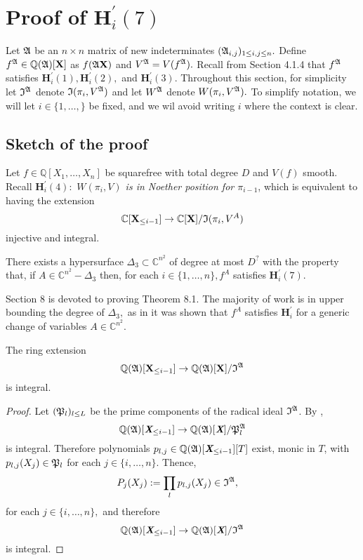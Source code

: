 \documentclass[sigconf]{acmart}
\def\Xb{\textit{\textbf{X}}}
\def\C{\mathbb{C}}
\def\I{\frak{I}}
\def\A{\frak{A}}
\def\fp{\frak{P}}
\begin{document}
\section{Proof of $\textbf{H}_i^{'}(7)$}
%
Let $\A$ be an $n \times n$ matrix of new indeterminates $(\A_{i,j})_{1 \leq i , j \leq n}.$ Define $f^{\A} \in \mathbb{Q}(\A)[\textbf{X}]$ as $f(\A\textbf{X})$ and $V^\A=V(f^\A).$ Recall from Section 4.1.4 that $f^\A$ satisfies $\textbf{H}_i^{'}(1),\textbf{H}_i^{'}(2),$ and $\textbf{H}_i^{'}(3).$ Throughout this section, for simplicity let $\I^\A$ denote $\I(\pi_i,V^\A)$ and let $W^\A$ denote $W(\pi_i,V^\A).$ To simplify notation, we will let $i \in \{1,\hdots,\}$ be fixed, and we wil avoid writing $i$ where the context is clear. 
%
\subsection{Sketch of the proof}
Let $f \in \mathbb{Q}[X_1,\hdots,X_n]$ be squarefree with total degree $D$ and $V(f)$ smooth. Recall $\textbf{H}_i^{'}(4):$ \textit{$W(\pi_i,V)$ is in Noether position for $\pi_{i-1}$}, which is equivalent to having the extension  
\[
\C[\textbf{X}_{\leq i-1}]\rightarrow\C[\textbf{X}]/\frak{I}(\pi_i,V^A)
\]
injective and  integral.
%
\begin{theorem}
There exists a hypersurface $\Delta_3 \subset \C^{n^2}$ of degree at most $D^{?}$ with the property that, if $A \in \C^{n^2} - \Delta_3$ then, for each $i \in\{1,\hdots,n\}, f^A$ satisfies $\textbf{H}_i^{'}(7)$.
\end{theorem}
%
Section 8 is devoted to proving Theorem 8.1. The majority of work is in upper bounding the degree of $\Delta_3,$ as in \cite{EMP} it was shown that $f^A$ satisfies $\textbf{H}_i^{'}$ for a generic change of variables $A\in\C^{n^2}.$ 
%
\begin{proposition} 
The ring extension \[\mathbb{Q}(\frak{A})[\textbf{X}_{\leq i-1}]\rightarrow\mathbb{Q}(\frak{A})[\textbf{X}]/\I^{\A}\] is integral.
\end{proposition}
%
\begin{proof}
Let $(\frak{P}_l)_{l \leq L}$ be the prime components of the radical ideal $\I^\A$. By \cite[Proposition 1]{EMP}, 
\[
\mathbb{Q}(\frak{A})[\textit{\textbf{X}}_{\leq i-1}]\rightarrow\mathbb{Q}(\frak{A})[\textit{\textbf{X}}]/\fp_l^{\A}
\] 
is integral. Therefore polynomials $p_{l,j}\in\mathbb{Q}(\frak{A})[\Xb_{\leq i-1}][T]$ exist, monic in $T$, with $p_{l,j}(X_j)\in \frak{P}_l$ for each $j\in \{i,\hdots,n\}.$ Thence, 
%
\begin{align*}
&P_{j}(X_j) := \prod_l p_{l,j}(X_j)\in\I^\A, 
\end{align*}
%
for each $j \in \{i,\hdots,n\},$ and therefore 
\[
\mathbb{Q}(\frak{A})[\textit{\textbf{X}}_{\leq i-1}]\rightarrow\mathbb{Q}(\frak{A})[\textit{\textbf{X}}]/\I^{\A}
\] 
is integral.
\end{proof}
\end{document}
